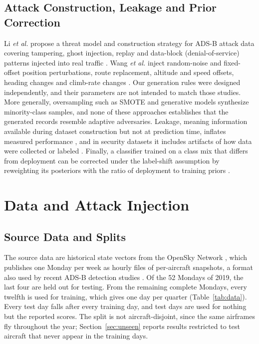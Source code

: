 \documentclass[conference]{IEEEtran}
\begin{document}
\subsection{Attack Construction, Leakage and Prior Correction}
Li \emph{et al.} propose a threat model and construction strategy for ADS-B attack data covering tampering, ghost injection, replay and data-block (denial-of-service) patterns injected into real traffic \cite{li2020}. Wang \emph{et al.} inject random-noise and fixed-offset position perturbations, route replacement, altitude and speed offsets, heading changes and climb-rate changes \cite{wang2020}. Our generation rules were designed independently, and their parameters are not intended to match those studies. More generally, oversampling such as SMOTE \cite{chawla2002} and generative models \cite{goodfellow2014} synthesize minority-class samples, and none of these approaches establishes that the generated records resemble adaptive adversaries. Leakage, meaning information available during dataset construction but not at prediction time, inflates measured performance \cite{kapoor2023}, and in security datasets it includes artifacts of how data were collected or labeled \cite{arp2022}. Finally, a classifier trained on a class mix that differs from deployment can be corrected under the label-shift assumption by reweighting its posteriors with the ratio of deployment to training priors \cite{saerens2002,elkan2001}.

\section{Data and Attack Injection}\label{sec:data}

\subsection{Source Data and Splits}
The source data are historical state vectors from the OpenSky Network \cite{schafer2014}, which publishes one Monday per week as hourly files of per-aircraft snapshots, a format also used by recent ADS-B detection studies \cite{ngamboe2025}. Of the 52 Mondays of 2019, the last four are held out for testing. From the remaining complete Mondays, every twelfth is used for training, which gives one day per quarter (Table~\ref{tab:data}). Every test day falls after every training day, and test days are used for nothing but the reported scores. The split is not aircraft-disjoint, since the same airframes fly throughout the year; Section~\ref{sec:unseen} reports results restricted to test aircraft that never appear in the training days.
\end{document}
